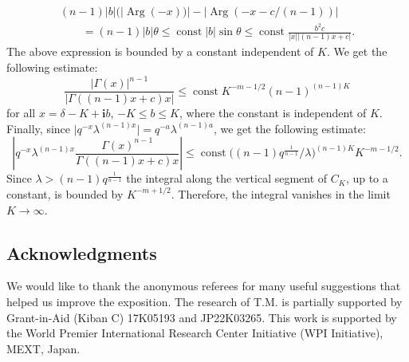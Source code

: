 \documentclass[10pt,a4paper]{article}
\numberwithin{equation}{section}
\newcommand{\ii}{\mathbf{i}}
\begin{document}
\begin{gather*}
(n-1)|b|(
|{\operatorname{Arg}}(-x))|-|{\operatorname{Arg}}(-x-c/(n-1) )| \\
\qquad=
(n-1)|b|\theta \leq
\operatorname{const} |b|\sin\theta \leq
\operatorname{const}
\frac{b^2 c}{|x| |(n-1)x+c|}.
\end{gather*}
The above expression is bounded by a constant independent of $K$. We get the following estimate:
\[
\frac{|\Gamma(x)|^{n-1}}{
|\Gamma((n-1)x+c) x| }\leq
\operatorname{const}
K^{-m-1/2}
(n-1)^{(n-1) K}
\]
for all $x=\delta-K + \ii b$, $-K\leq b\leq K$, where the constant is independent of $K$. Finally, since $\big|q^{-x}\lambda^{(n-1)x}\big|=q^{-a}\lambda^{(n-1)a}$, we get the following estimate:
\[
\left|
q^{-x}\lambda^{(n-1)x}
\frac{\Gamma(x)^{n-1}}{
\Gamma((n-1)x+c) x }
\right| \leq \operatorname{const}
\big((n-1) q^{\frac{1}{n-1}}/\lambda\big)^{(n-1)K}
K^{-m-1/2}.
\]
Since $\lambda> (n-1) q^{\frac{1}{n-1}}$ the integral along the vertical segment of $C_K$, up to a constant, is bounded by $K^{-m+1/2}$. Therefore, the integral vanishes in the limit $K\to \infty$.

\subsection*{Acknowledgments}
We would like to thank the anonymous referees for many useful
suggestions that helped us improve the exposition.
The research of T.M. is partially supported by Grant-in-Aid (Kiban C)
17K05193 and JP22K03265. This work is supported by the World Premier International Research
Center Initiative (WPI Initiative), MEXT, Japan.
\end{document}

